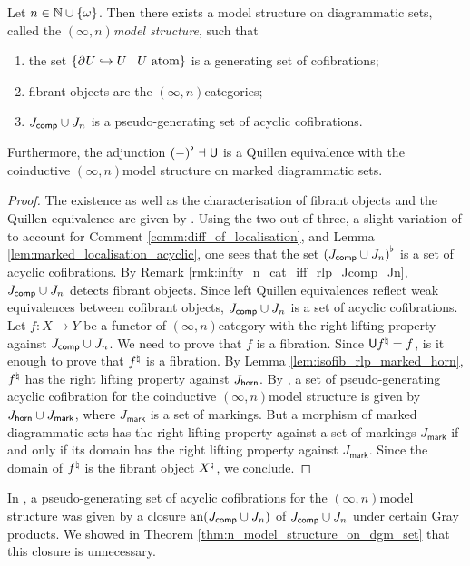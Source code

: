 \begin{thm} \label{thm:n_model_structure_on_dgm_set}
    Let \( n \in \mathbb{N} \cup \left\{ {\omega} \right\} \).
    Then there exists a model structure on diagrammatic sets, called the \emph{\( (\infty, n) \)\nbd model structure}, such that
    \begin{enumerate}
        \item the set \( \left\{ {\partial_{}^{} U \hookrightarrow U \mid U \text{ atom}} \right\} \) is a generating set of cofibrations;
        \item fibrant objects are the \( (\infty, n) \)\nbd categories;
        \item \( J_{\mathsf{comp}} \cup J_{n} \) is a pseudo-generating set of acyclic cofibrations.
    \end{enumerate}
    Furthermore, the adjunction \( {(-)}^{\flat} \dashv \mathsf{U} \) is a Quillen equivalence with the coinductive \( (\infty, n) \)\nbd model structure on marked diagrammatic sets.
\end{thm}
\begin{proof}
    The existence as well as the characterisation of fibrant objects and the Quillen equivalence are given by \cite[3.27, Theorem 4.21, Theorem 4.23]{chanavat2024model}.
    Using the two-out-of-three, a slight variation of \cite[Lemma 4.16]{chanavat2024model} to account for Comment \ref{comm:diff_of_localisation}, and Lemma \ref{lem:marked_localisation_acyclic}, one sees that the set \( {(J_{\mathsf{comp}} \cup J_{n})}^{\flat} \) is a set of acyclic cofibrations.
    By Remark \ref{rmk:infty_n_cat_iff_rlp_Jcomp_Jn}, \( J_{\mathsf{comp}} \cup J_{n} \) detects fibrant objects.
    Since left Quillen equivalences reflect weak equivalences between cofibrant objects, \( J_{\mathsf{comp}} \cup J_{n} \) is a set of acyclic cofibrations.
    Let \( f \colon X \to Y \) be a functor of \( (\infty, n) \)\nbd category with the right lifting property against \( J_{\mathsf{comp}} \cup J_{n} \).
    We need to prove that \( f \) is a fibration.
    Since \( \mathsf{U}{f}^{\natural} = f \), is it enough to prove that \( {f}^{\natural} \) is a fibration. 
    By Lemma \ref{lem:isofib_rlp_marked_horn}, \( {f}^{\natural} \) has the right lifting property against \( J_{\mathsf{horn}} \).
    By \cite[Theorem 4.22]{chanavat2025gray}, a set of pseudo-generating acyclic cofibration for the coinductive \( (\infty, n) \)\nbd model structure is given by \( J_{\mathsf{horn}} \cup J_{\mathsf{mark}} \), where \( J_{\mathsf{mark}} \) is a set of markings.
    But a morphism of marked diagrammatic sets has the right lifting property against a set of markings \( J_{\mathsf{mark}} \) if and only if its domain has the right lifting property against \( J_{\mathsf{mark}} \).
    Since the domain of \( {f}^{\natural} \) is the fibrant object \( {X}^{\natural} \), we conclude.
\end{proof}

\begin{comm}
    In \cite{chanavat2024model}, a pseudo-generating set of acyclic cofibrations for the \( (\infty, n) \)\nbd model structure was given by a closure \( \mathrm{an}(J_{\mathsf{comp}} \cup J_{n}) \) of \( J_{\mathsf{comp}} \cup J_{n} \) under certain Gray products.
    We showed in Theorem \ref{thm:n_model_structure_on_dgm_set} that this closure is unnecessary.
\end{comm}


